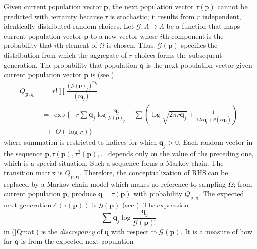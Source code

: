 Given current population vector $\bm{p}$, the next population vector $\tau(\bm{p})$ cannot 
be predicted with certainty because $\tau$ is stochastic; it results from $r$ independent, identically distributed random choices. 
Let $\mathcal{G}:\Lambda \rightarrow \Lambda$ be a function that maps 
current population vector $\bm{p}$ to a new vector whose $i$th component 
is the probability that $i$th element of $\Omega$ is chosen. Thus, $\mathcal{G}(\bm{p})$ 
specifies the distribution from which the aggregate 
of $r$ choices forms the subsequent generation. The probability that population $\bm{q}$ is 
the next population vector given current population vector $\bm{p}$ is (see \cite{Vose1999}) 
\begin{equation}
\label{Qmat}
\begin{split}
Q_{\bm{p},\bm{q}} & \;=\; r! \prod \frac{(\mathcal{G}(\bm{p})_j)^{r\bm{q}_j}}{(r\bm{q}_j)!} \\
& \;=\; \exp\{-r \sum \bm{q}_j \log \frac{\bm{q}_j}{\mathcal{G}(\bm{p})_j} - \sum (\log \sqrt{2 \pi r\bm{q}_j}  + \frac{1}{12r\bm{q}_j + \theta (r\bm{q}_j)}) \\      
& \;\;\; + \; O(\log r)\}
\end{split}
\end{equation}
where summation is restricted to indices for which $\bm{q}_j > 0$.
Each random vector in the sequence $\bm{p}, \tau(\bm{p}), \tau^2(\bm{p}),...$ depends only on the value of the preceding one, 
which is a special situation. Such a sequence forms a Markov chain. The transition matrix is $Q_{\bm{p},\bm{q}}$. Therefore, 
the conceptualization of RHS can be replaced by a Markov chain model which makes no reference to sampling $\Omega$; 
from current population $\bm{p}$, produce $\bm{q} = \tau (\bm{p})$ with probability $Q_{\bm{p},\bm{q}}$. The expected next generation 
$\mathcal{E}(\tau (\bm{p}))$ is $\mathcal{G}(\bm{p})$ (see \cite{Vose1999}). The expression 
\[
\sum \bm{q}_j \log \frac{\bm{q}_j}{\mathcal{G}(\bm{p})!}
\]
in (\ref{Qmat}) is the {\em discrepancy} of $\bm{q}$ with respect to $\mathcal{G}(\bm{p})$. It is a measure of how far $\bm{q}$ is from the expected next population 
